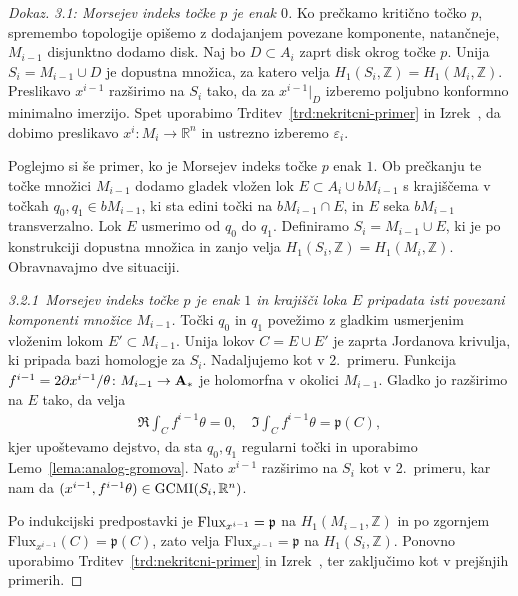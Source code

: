 \documentclass[12pt,a4paper,twoside]{article}
\theoremstyle{definition} %
\newenvironment{dokaz}[1][Dokaz]{\begin{proof}[#1]}{\end{proof}}
\theoremstyle{plain} %
\numberwithin{equation}{section}  %
\newcommand{\Z}{\mathbb Z}
\begin{document}
\begin{dokaz}
\textit{3.1: Morsejev indeks točke $p$ je enak $0$.} \newline
Ko prečkamo kritično točko $p$, spremembo topologije opišemo z dodajanjem povezane komponente, natančneje, $M_{i-1}$ disjunktno dodamo disk.
Naj bo $D \subset A_{i}$ zaprt disk okrog točke $p$. Unija $S_{i} = M_{i-1} \cup D$ je dopustna množica, za katero velja $H_{1}(S_{i}, \mathbb{Z}) = H_{1}(M_{i}, \mathbb{Z})$.
Preslikavo $x^{i-1}$ razširimo na $S_{i}$ tako, da za $x^{i-1}|_{D}$ izberemo poljubno konformno minimalno imerzijo.
Spet uporabimo Trditev~\ref{trd:nekritcni-primer} in Izrek~\cite[Theorem~3.4.1]{alarcon2021minimal},
da dobimo preslikavo $x^{i} \colon M_{i} \to \mathbb{R}^{n}$ in ustrezno izberemo $\varepsilon_{i}$. \newline

Poglejmo si še primer, ko je Morsejev indeks točke $p$ enak $1$. Ob prečkanju te točke množici $M_{i-1}$ dodamo gladek vložen lok $E \subset A_{i} \cup bM_{i-1}$ s krajiščema v točkah $q_0, q_1 \in bM_{i-1}$, ki sta edini točki na $bM_{i-1} \cap E$, in $E$ seka $bM_{i-1}$ transverzalno. Lok $E$ usmerimo od $q_0$ do $q_1$.
Definiramo $S_{i} = M_{i-1} \cup E$, ki je po konstrukciji dopustna množica in zanjo velja $H_{1}(S_{i}, \mathbb{Z}) = H_{1}(M_{i}, \mathbb{Z})$. Obravnavajmo dve situaciji. \newline

\textit{3.2.1~Morsejev indeks točke $p$ je enak $1$ in krajišči loka $E$ pripadata isti povezani komponenti množice $M_{i-1}$.} \newline
Točki $q_0$ in $q_1$ povežimo z gladkim usmerjenim vloženim lokom $E' \subset M_{i-1}$. 
Unija lokov $C = E \cup E'$ je zaprta Jordanova krivulja, ki pripada bazi homologje za $S_{i}$.
Nadaljujemo kot v 2.~primeru. Funkcija $f^{i-1} = 2 \partial x^{i-1} / \theta \colon M_{i-1} \to \textup{\textbf{A}}_{*}$ je holomorfna v okolici $M_{i-1}$.
Gladko jo razširimo na $E$ tako, da velja
\begin{gather*}
\Re \int_{C} f^{i-1} \theta = 0, \quad \Im \int_{C} f^{i-1} \theta = \mathfrak{p}(C),
\end{gather*}
kjer upoštevamo dejstvo, da sta $q_0, q_1$ regularni točki in uporabimo Lemo~\ref{lema:analog-gromova}.
Nato $x^{i-1}$ razširimo na $S_{i}$ kot v 2.~primeru, kar nam da $(x^{i-1}, f^{i-1} \theta) \in \textup{GCMI}(S_{i}, \mathbb{R}^{n})$.

Po indukcijski predpostavki je $\textup{Flux}_{x^{i-1}} = \mathfrak{p}$ na $H_{1}(M_{i-1},\Z)$ in po zgornjem $\text{Flux}_{x^{i-1}}(C) = \mathfrak{p}(C)$, zato velja
$\text{Flux}_{x^{i-1}} = \mathfrak{p}$ na $H_{1}(S_{i},\Z)$.
Ponovno uporabimo Trditev~\ref{trd:nekritcni-primer} in Izrek~\cite[Theorem~3.4.1]{alarcon2021minimal},
ter zaključimo kot v prejšnjih primerih. \newline


\end{dokaz}
\end{document}
